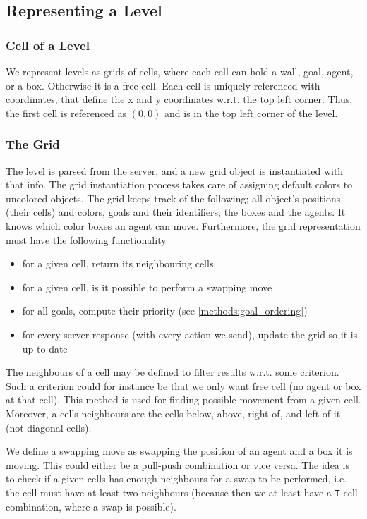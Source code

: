 \subsection{Representing a Level}
\label{sec:representing a level}

\subsubsection{Cell of a Level}

We represent levels as grids of cells, where each cell can hold a wall, goal, agent, or a box.
Otherwise it is a free cell.
Each cell is uniquely referenced with coordinates, that define the x and y coordinates w.r.t. the top left corner.
Thus, the first cell is referenced as $(0,0)$ and is in the top left corner of the level.

\subsubsection{The Grid}

The level is parsed from the server, and a new grid object is instantiated with that info.
The grid instantiation process takes care of assigning default colors to uncolored objects.
The grid keeps track of the following; all object's positions (their cells) and colors, goals and their identifiers, the boxes and the agents.
It knows which color boxes an agent can move.
Furthermore, the grid representation must have the following functionality
%
\begin{itemize}
  \item for a given cell, return its neighbouring cells
  \item for a given cell, is it possible to perform a swapping move
  \item for all goals, compute their priority (see \cref{methods:goal_ordering})
  \item for every server response (with every action we send), update the grid so it is up-to-date
\end{itemize}
%
The neighbours of a cell may be defined to filter results w.r.t. some criterion.
Such a criterion could for instance be that we only want free cell (no agent or box at that cell).
This method is used for finding possible movement from a given cell.
Moreover, a cells neighbours are the cells below, above, right of, and left of it (not diagonal cells).

We define a swapping move as swapping the position of an agent and a box it is moving.
This could either be a pull-push combination or vice versa.
The idea is to check if a given cells has enough neighbours for a swap to be performed, i.e. the cell must have at least two neighbours (because then we at least have a \texttt{T}-cell-combination, where a swap is possible).

